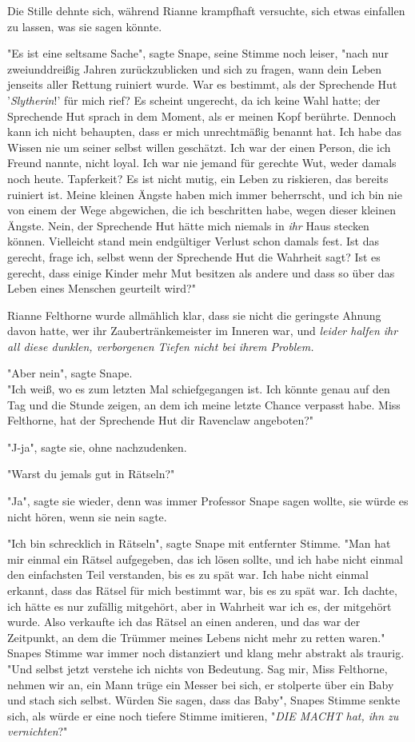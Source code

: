 {Die Stille dehnte sich, während Rianne krampfhaft versuchte, sich etwas einfallen zu lassen, was sie sagen könnte.

"Es ist eine seltsame Sache", sagte Snape, seine Stimme noch leiser, "nach nur zweiunddreißig Jahren zurückzublicken und sich zu fragen, wann dein Leben jenseits aller Rettung ruiniert wurde. War es bestimmt, als der Sprechende Hut '\emph{Slytherin}!' für mich rief? Es scheint ungerecht, da ich keine Wahl hatte; der Sprechende Hut sprach in dem Moment, als er meinen Kopf berührte. Dennoch kann ich nicht behaupten, dass er mich unrechtmäßig benannt hat. Ich habe das Wissen nie um seiner selbst willen geschätzt. Ich war der einen Person, die ich Freund nannte, nicht loyal. Ich war nie jemand für gerechte Wut, weder damals noch heute. Tapferkeit? Es ist nicht mutig, ein Leben zu riskieren, das bereits ruiniert ist. Meine kleinen Ängste haben mich immer beherrscht, und ich bin nie von einem der Wege abgewichen, die ich beschritten habe, wegen dieser kleinen Ängste. Nein, der Sprechende Hut hätte mich niemals in \emph{ihr} Haus stecken können. Vielleicht stand mein endgültiger Verlust schon damals fest. Ist das gerecht, frage ich, selbst wenn der Sprechende Hut die Wahrheit sagt? Ist es gerecht, dass einige Kinder mehr Mut besitzen als andere und dass so über das Leben eines Menschen geurteilt wird?"

Rianne Felthorne wurde allmählich klar, dass sie nicht die geringste Ahnung davon hatte, wer ihr Zaubertränkemeister im Inneren war, und \emph{leider halfen ihr all diese dunklen, verborgenen Tiefen nicht bei ihrem Problem.}

"Aber nein", sagte Snape.\\ "Ich weiß, wo es zum letzten Mal schiefgegangen ist. Ich könnte genau auf den Tag und die Stunde zeigen, an dem ich meine letzte Chance verpasst habe. Miss Felthorne, hat der Sprechende Hut dir Ravenclaw angeboten?"

"J-ja", sagte sie, ohne nachzudenken.

"Warst du jemals gut in Rätseln?"

"Ja", sagte sie wieder, denn was immer Professor Snape sagen wollte, sie würde es nicht hören, wenn sie nein sagte.

"Ich bin schrecklich in Rätseln", sagte Snape mit entfernter Stimme. "Man hat mir einmal ein Rätsel aufgegeben, das ich lösen sollte, und ich habe nicht einmal den einfachsten Teil verstanden, bis es zu spät war. Ich habe nicht einmal erkannt, dass das Rätsel für mich bestimmt war, bis es zu spät war. Ich dachte, ich hätte es nur zufällig mitgehört, aber in Wahrheit war ich es, der mitgehört wurde. Also verkaufte ich das Rätsel an einen anderen, und das war der Zeitpunkt, an dem die Trümmer meines Lebens nicht mehr zu retten waren."\\ Snapes Stimme war immer noch distanziert und klang mehr abstrakt als traurig.\\ "Und selbst jetzt verstehe ich nichts von Bedeutung. Sag mir, Miss Felthorne, nehmen wir an, ein Mann trüge ein Messer bei sich, er stolperte über ein Baby und stach sich selbst. Würden Sie sagen, dass das Baby", Snapes Stimme senkte sich, als würde er eine noch tiefere Stimme imitieren, "\emph{DIE MACHT hat, ihn zu vernichten}?"

}
